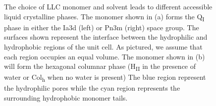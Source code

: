 \documentclass[journal=jpcbfk,manusciprt=article]{achemso}
\begin{document}
\begin{figure}
  \caption{The choice of LLC monomer and solvent leads to different accessible liquid
        crystalline phases. The monomer shown in (a) forms the Q\textsubscript{I} phase
        in either the Ia3d (left) or Pn3m (right) space group. The surfaces shown
        represent the interface between the hydrophilic and hydrophobic regions of the unit
        cell. As pictured, we assume that each region occupies an equal volume. The
        monomer shown in (b) will form the hexagonal columnar phase
        (H\textsubscript{II} in the presence of water or Col\textsubscript{h} when no
         water is present) The blue region represent the hydrophilic pores while the cyan region represents the surrounding hydrophobic monomer tails.}\label{fig:bcc_v_hII}
  \end{figure}



\end{document}
